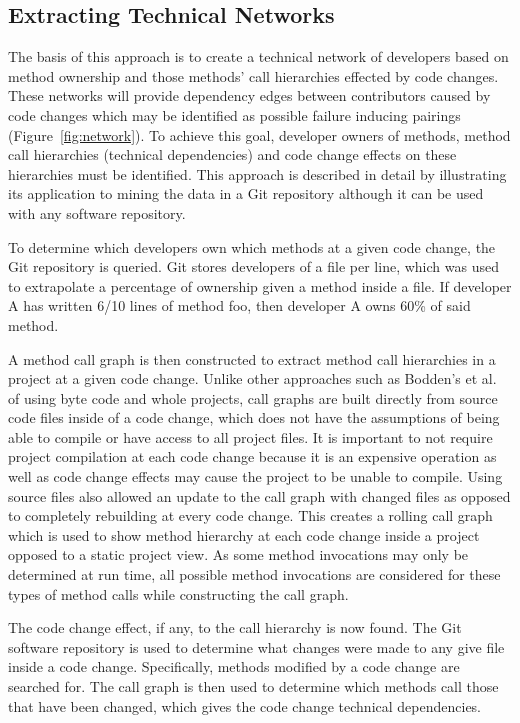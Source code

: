 \documentclass[conference]{IEEEtran}
\begin{document}
\subsection{Extracting Technical Networks}
The basis of this approach is to create a technical network of developers based on method ownership
and those methods' call hierarchies effected by code changes. These networks will provide
dependency edges between contributors caused by code changes which may be 
identified as possible failure inducing pairings (Figure~\ref{fig:network}). To achieve this goal,
developer owners of methods, method call hierarchies (technical
dependencies) and code change effects on these hierarchies must be identified.
This approach is described in detail by illustrating its application to mining the data in a Git
repository although it can be used with any software repository.

To determine which developers own which methods at a given code change,
the Git repository is queried. Git stores developers of a file per line, which was used to extrapolate
a percentage of ownership given a method inside a file. If developer A has written 6/10 lines of 
method foo, then developer A owns 60\% of said method.

A method call graph is then constructed to extract method call hierarchies in a project at a given code change. 
Unlike other approaches such as Bodden's et al.~\cite{Bodden:2003:HVJ} 
of using byte code and whole projects, call graphs are built directly from source code files
inside of a code change, 
which does not have the assumptions of being able to compile or have access to all project 
files. It is important to not require project compilation at each code change because it is
an expensive operation as well as code change effects may cause the project
to be unable to compile. Using source files also allowed an update to the call graph
with changed files as opposed to completely rebuilding at 
every code change. This creates a rolling call graph which 
is used to show method hierarchy at each code change inside a project opposed to
a static project view. As some method invocations may only be determined at run time, all
possible method invocations are considered for these types of method calls while constructing
the call graph.

The code change effect, if any, to the call hierarchy is now found. The Git
software repository is used to determine what changes were made to any give file inside a 
code change. Specifically, methods modified by a code change are searched for. The call graph 
is then used to determine which methods call those that have been changed, which
gives the code change technical dependencies.
\end{document}
